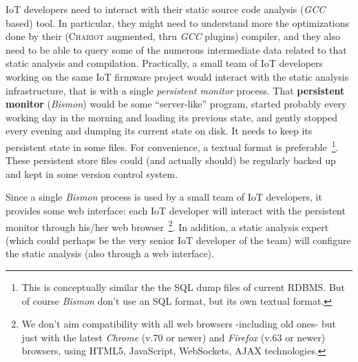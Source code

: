 IoT developers need to interact with their static source code analysis
(\emph{GCC} based) tool. In particular, they might need to understand
more the optimizations done by their (\textsc{Chariot} augmented, thru
\emph{GCC} plugins) compiler, and they also need to be able to query
some of the numerous intermediate data related to that static analysis
and compilation. Practically, a small team of IoT developers working
on the same IoT firmware project would interact with the static
analysis infrastructure, that is with a single \emph{persistent
  monitor} process. That \textbf{persistent monitor} (\emph{Bismon})
would be some ``server-like'' program, started probably every working
day in the morning and loading its previous state, and gently stopped
every evening and dumping its current state on disk. It needs to keep
its persistent state in some files. For convenience, a textual format
is preferable~\footnote{This is conceptually similar the the SQL dump
  files of current RDBMS. But of course \emph{Bismon} don't use an SQL
  format, but its own textual format.}. These persistent store files
could (and actually should) be regularly backed up and kept in some
version control system.

Since a single \emph{Bismon} process is used by a small team of IoT
developers, it provides some web interface: each
IoT developer will interact with the persistent monitor through his/her
web  browser~\footnote{We don't aim compatibility with
  all web browsers -including old ones- but just with the latest
  \emph{Chrome} (v.70 or newer) and \emph{Firefox} (v.63 or newer)
  browsers, using HTML5, JavaScript, WebSockets, AJAX
  technologies.}. In addition, a static analysis expert (which could
perhaps be the very senior IoT developer of the team) will configure
the static analysis (also through a web interface).

